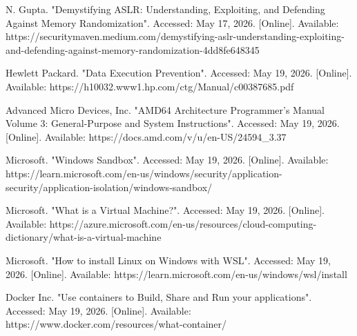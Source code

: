 \documentclass[titlepage]{article}
\begin{document}
    \vspace{0.5em}

    N. Gupta. "Demystifying ASLR: Understanding, Exploiting, and Defending
    Against Memory Randomization". Accessed: May 17, 2026. [Online].
    Available:
    https://securitymaven.medium.com/demystifying-aslr-understanding-exploiting-and-defending-against-memory-randomization-4dd8fe648345

    \vspace{0.5em}

    Hewlett Packard. "Data Execution Prevention". Accessed: May 19, 2026.
    [Online]. Available:
    https://h10032.www1.hp.com/ctg/Manual/c00387685.pdf

    \vspace{0.5em}

    Advanced Micro Devices, Inc. "AMD64 Architecture Programmer's Manual
    Volume 3: General-Purpose and System Instructions". Accessed: May 19,
    2026. [Online]. Available:
    https://docs.amd.com/v/u/en-US/24594\_3.37

    \vspace{0.5em}

    Microsoft. "Windows Sandbox". Accessed: May 19, 2026. [Online].
    Available:
    https://learn.microsoft.com/en-us/windows/security/application-security/application-isolation/windows-sandbox/

    \vspace{0.5em}

    Microsoft. "What is a Virtual Machine?". Accessed: May 19, 2026.
    [Online]. Available:
    https://azure.microsoft.com/en-us/resources/cloud-computing-dictionary/what-is-a-virtual-machine

    \vspace{0.5em}

    Microsoft. "How to install Linux on Windows with WSL". Accessed: May
    19, 2026. [Online]. Available:
    https://learn.microsoft.com/en-us/windows/wsl/install

    \vspace{0.5em}

    Docker Inc. "Use containers to Build, Share and Run your
    applications". Accessed: May 19, 2026. [Online]. Available:
    https://www.docker.com/resources/what-container/
\end{document}
